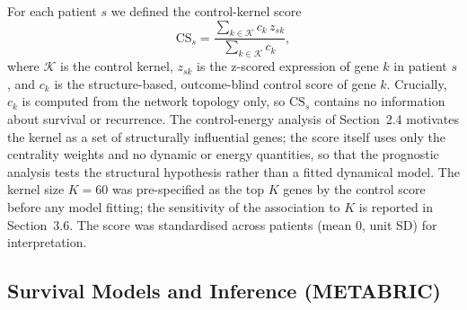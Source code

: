 \documentclass[12pt]{article}
\begin{document}
For each patient $s$ we defined the control-kernel score
\begin{equation}
\mathrm{CS}_s = \frac{\sum_{k \in \mathcal{K}} c_k\, z_{sk}}
{\sum_{k \in \mathcal{K}} c_k},
\end{equation}
where $\mathcal{K}$ is the control kernel, $z_{sk}$ is the z-scored
expression of gene $k$ in patient $s$, and $c_k$ is the structure-based,
outcome-blind control score of gene $k$. Crucially, $c_k$ is computed from
the network topology only, so $\mathrm{CS}_s$ contains no information about
survival or recurrence. The control-energy analysis of Section~2.4 motivates
the kernel as a set of structurally influential genes; the score itself uses
only the centrality weights and no dynamic or energy quantities, so that the
prognostic analysis tests the structural hypothesis rather than a fitted
dynamical model. The kernel size
$K = 60$ was pre-specified as the top $K$ genes by the control score before
any model fitting; the sensitivity of the association to $K$ is reported in
Section~3.6. The score was standardised across patients (mean 0, unit SD)
for interpretation.

\subsection{Survival Models and Inference (METABRIC)}
\end{document}
